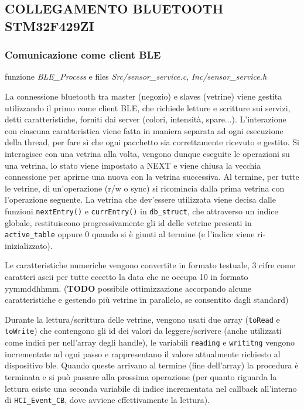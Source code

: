\subsection{COLLEGAMENTO BLUETOOTH STM32F429ZI}

\subsubsection{Comunicazione come client BLE}

funzione \textit{BLE\_Process} e files \textit{Src/sensor\_service.c}, \textit{Inc/sensor\_service.h}

La connessione bluetooth tra master (negozio) e slaves (vetrine) viene gestita utilizzando il primo come client BLE, che richiede letture e scritture sui servizi, detti caratteristiche, forniti dai server (colori, intensit\`{a}, spare...). L'interazione con ciascuna caratteristica viene fatta in maniera separata ad ogni esecuzione della thread, per fare s\`{i} che ogni pacchetto sia correttamente ricevuto e gestito. Si interagisce con una vetrina alla volta, vengono dunque eseguite le operazioni su una vetrina, lo stato viene impostato a NEXT e viene chiusa la vecchia connessione per aprirne una nuova con la vetrina successiva. Al termine, per tutte le vetrine, di un'operazione (r/w o sync) si ricomincia dalla prima vetrina con l'operazione seguente. La vetrina che dev'essere utilizzata viene decisa dalle funzioni \texttt{nextEntry()} e \texttt{currEntry()} in \texttt{db\_struct}, che attraverso un indice globale, restituiscono progressivamente gli id delle vetrine presenti in \texttt{active\_table} oppure 0 quando si \`{e} giunti al termine (e l'indice viene ri-inizializzato). 

Le caratteristiche numeriche vengono convertite in formato testuale, 3 cifre come caratteri ascii per tutte eccetto la data che ne occupa 10 in formato yymmddhhmm. (\textbf{TODO} possibile ottimizzazione accorpando alcune caratteristiche e gestendo pi\`{u} vetrine in parallelo, se consentito dagli standard)

Durante la lettura/scrittura delle vetrine, vengono usati due array (\texttt{toRead} e \texttt{toWrite}) che contengono gli id dei valori da leggere/scrivere (anche utilizzati come indici per nell'array degli handle), le variabili \texttt{reading} e \texttt{writitng} vengono incrementate ad ogni passo e rappresentano il valore attualmente richiesto al dispositivo ble. Quando queste arrivano al termine (fine dell'array) la procedura \`{e} terminata e si pu\`{o} passare alla prossima operazione (per quanto riguarda la lettura esiste una seconda variabile di indice incrementata nel callback all'interno di \texttt{HCI\_Event\_CB}, dove avviene effettivamente la lettura).

